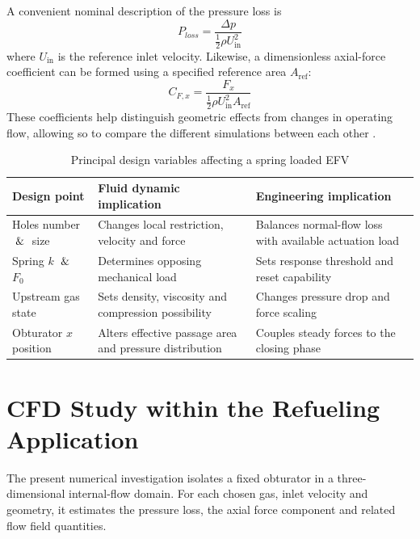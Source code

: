 A convenient nominal description of the pressure loss is
\begin{equation}
P_{loss}=\frac{\Delta p}{\tfrac{1}{2}\rho U_{\mathrm{in}}^2}
\label{eq:efv_loss_coefficient}
\end{equation}
where $U_{\mathrm{in}}$ is the reference inlet velocity. Likewise, a dimensionless axial-force coefficient can be formed using a specified reference area $A_{\mathrm{ref}}$:
\begin{equation}
C_{F,x}=\frac{F_x}{\tfrac{1}{2}\rho U_{\mathrm{in}}^2 A_{\mathrm{ref}}}
\label{eq:efv_force_coefficient}
\end{equation}
These coefficients help distinguish geometric effects from changes in operating flow, allowing so to compare the different simulations between each other \cite{white2016}.

\begin{table}[htbp]
\centering
\small
\begin{tabular}{@{}p{}p{}p{}@{}}
\toprule
\textbf{Design point} & \textbf{Fluid dynamic implication} & \textbf{Engineering implication}\\
\midrule
Holes number $\And$ size & Changes local restriction, velocity and force  & Balances normal-flow loss with available actuation load\\
Spring $k$ $\And$ $F_0$ & Determines opposing mechanical load & Sets response threshold and reset capability\\
Upstream gas state & Sets density, viscosity and compression possibility & Changes pressure drop and force scaling\\
Obturator $x$ position & Alters effective passage area and pressure distribution & Couples steady forces to the closing phase\\
\bottomrule
\end{tabular}
\caption{Principal design variables affecting a spring loaded EFV}
\label{tab:efv_design_tradeoffs}
\end{table}

\section{CFD Study within the Refueling Application}
\label{sec:efv_cfd_scope}

The present numerical investigation isolates a fixed obturator in a three-dimensional internal-flow domain. For each chosen gas, inlet velocity and geometry, it estimates the pressure loss, the axial force component and related flow field quantities. 

